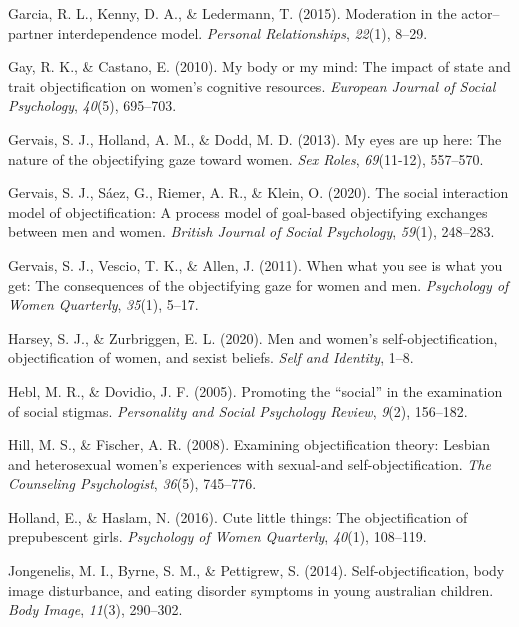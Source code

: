\documentclass[man]{apa6}
\begin{document}
\hypertarget{ref-garcia2015moderation}{}
Garcia, R. L., Kenny, D. A., \& Ledermann, T. (2015). Moderation in the
actor--partner interdependence model. \emph{Personal Relationships},
\emph{22}(1), 8--29.

\hypertarget{ref-gay2010my}{}
Gay, R. K., \& Castano, E. (2010). My body or my mind: The impact of
state and trait objectification on women's cognitive resources.
\emph{European Journal of Social Psychology}, \emph{40}(5), 695--703.

\hypertarget{ref-gervais2013my}{}
Gervais, S. J., Holland, A. M., \& Dodd, M. D. (2013). My eyes are up
here: The nature of the objectifying gaze toward women. \emph{Sex
Roles}, \emph{69}(11-12), 557--570.

\hypertarget{ref-gervais2020social}{}
Gervais, S. J., Sáez, G., Riemer, A. R., \& Klein, O. (2020). The social
interaction model of objectification: A process model of goal-based
objectifying exchanges between men and women. \emph{British Journal of
Social Psychology}, \emph{59}(1), 248--283.

\hypertarget{ref-gervais2011you}{}
Gervais, S. J., Vescio, T. K., \& Allen, J. (2011). When what you see is
what you get: The consequences of the objectifying gaze for women and
men. \emph{Psychology of Women Quarterly}, \emph{35}(1), 5--17.

\hypertarget{ref-harsey2020men}{}
Harsey, S. J., \& Zurbriggen, E. L. (2020). Men and women's
self-objectification, objectification of women, and sexist beliefs.
\emph{Self and Identity}, 1--8.

\hypertarget{ref-hebl2005promoting}{}
Hebl, M. R., \& Dovidio, J. F. (2005). Promoting the ``social'' in the
examination of social stigmas. \emph{Personality and Social Psychology
Review}, \emph{9}(2), 156--182.

\hypertarget{ref-hill2008examining}{}
Hill, M. S., \& Fischer, A. R. (2008). Examining objectification theory:
Lesbian and heterosexual women's experiences with sexual-and
self-objectification. \emph{The Counseling Psychologist}, \emph{36}(5),
745--776.

\hypertarget{ref-holland2016}{}
Holland, E., \& Haslam, N. (2016). Cute little things: The
objectification of prepubescent girls. \emph{Psychology of Women
Quarterly}, \emph{40}(1), 108--119.

\hypertarget{ref-jongenelis2014}{}
Jongenelis, M. I., Byrne, S. M., \& Pettigrew, S. (2014).
Self-objectification, body image disturbance, and eating disorder
symptoms in young australian children. \emph{Body Image}, \emph{11}(3),
290--302.
\end{document}

